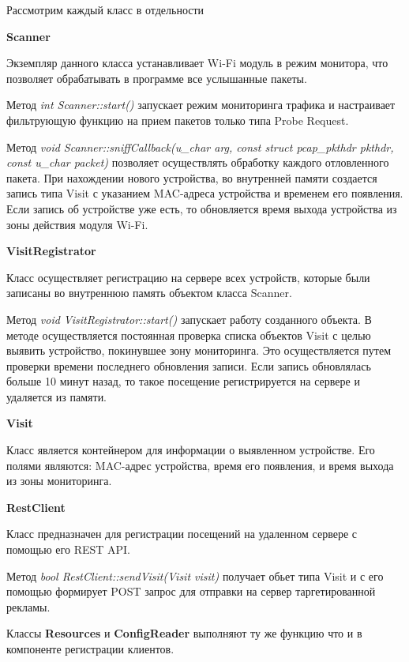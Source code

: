 Рассмотрим каждый класс в отдельности

\textbf{Scanner}

Экземпляр данного класса устанавливает Wi-Fi модуль в режим монитора, что позволяет обрабатывать в программе все услышанные пакеты.

Метод \textit{int Scanner::start()} запускает режим мониторинга трафика и настраивает фильтрующую функцию на прием пакетов только типа Probe Request.

Метод \textit{void Scanner::sniffCallback(u\_char \*arg, const struct pcap\_pkthdr \*pkthdr, const u\_char \*packet)} позволяет осуществлять обработку каждого отловленного пакета. При нахождении нового устройства, во внутренней памяти создается запись типа Visit с указанием MAC-адреса устройства и временем его появления. Если запись об устройстве уже есть, то обновляется время выхода устройства из зоны действия модуля Wi-Fi.

\textbf{VisitRegistrator}

Класс осуществляет регистрацию на сервере всех устройств, которые были записаны во внутреннюю память объектом класса Scanner.

Метод \textit{void VisitRegistrator::start()} запускает работу созданного объекта. В методе осуществляется постоянная проверка списка объектов Visit с целью выявить устройство, покинувшее зону мониторинга. Это осуществляется путем проверки времени последнего обновления записи. Если запись обновлялась больше 10 минут назад, то такое посещение регистрируется на сервере и удаляется из памяти.

\textbf{Visit}

Класс является контейнером для информации о выявленном устройстве. Его полями являются: MAC-адрес устройства, время его появления, и время выхода из зоны мониторинга.

\textbf{RestClient}

Класс предназначен для регистрации посещений на удаленном сервере с помощью его REST API. 

Метод \textit{bool RestClient::sendVisit(Visit visit)} получает обьет типа Visit и с его помощью формирует POST запрос для отправки на сервер таргетированной рекламы.

Классы \textbf{Resources} и \textbf{ConfigReader} выполняют ту же функцию что и в компоненте регистрации клиентов.

